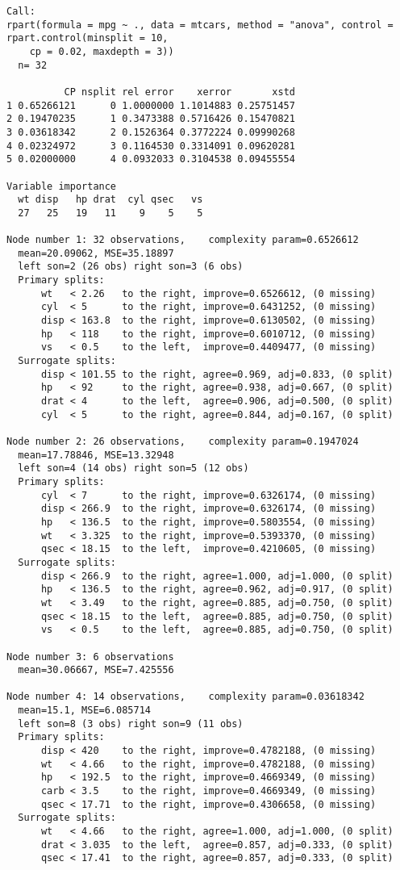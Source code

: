 \documentclass[
  letterpaper,
  DIV=11,
  numbers=noendperiod]{scrreprt}
\begin{document}
\begin{verbatim}
Call:
rpart(formula = mpg ~ ., data = mtcars, method = "anova", control = rpart.control(minsplit = 10, 
    cp = 0.02, maxdepth = 3))
  n= 32 

          CP nsplit rel error    xerror       xstd
1 0.65266121      0 1.0000000 1.1014883 0.25751457
2 0.19470235      1 0.3473388 0.5716426 0.15470821
3 0.03618342      2 0.1526364 0.3772224 0.09990268
4 0.02324972      3 0.1164530 0.3314091 0.09620281
5 0.02000000      4 0.0932033 0.3104538 0.09455554

Variable importance
  wt disp   hp drat  cyl qsec   vs 
  27   25   19   11    9    5    5 

Node number 1: 32 observations,    complexity param=0.6526612
  mean=20.09062, MSE=35.18897 
  left son=2 (26 obs) right son=3 (6 obs)
  Primary splits:
      wt   < 2.26   to the right, improve=0.6526612, (0 missing)
      cyl  < 5      to the right, improve=0.6431252, (0 missing)
      disp < 163.8  to the right, improve=0.6130502, (0 missing)
      hp   < 118    to the right, improve=0.6010712, (0 missing)
      vs   < 0.5    to the left,  improve=0.4409477, (0 missing)
  Surrogate splits:
      disp < 101.55 to the right, agree=0.969, adj=0.833, (0 split)
      hp   < 92     to the right, agree=0.938, adj=0.667, (0 split)
      drat < 4      to the left,  agree=0.906, adj=0.500, (0 split)
      cyl  < 5      to the right, agree=0.844, adj=0.167, (0 split)

Node number 2: 26 observations,    complexity param=0.1947024
  mean=17.78846, MSE=13.32948 
  left son=4 (14 obs) right son=5 (12 obs)
  Primary splits:
      cyl  < 7      to the right, improve=0.6326174, (0 missing)
      disp < 266.9  to the right, improve=0.6326174, (0 missing)
      hp   < 136.5  to the right, improve=0.5803554, (0 missing)
      wt   < 3.325  to the right, improve=0.5393370, (0 missing)
      qsec < 18.15  to the left,  improve=0.4210605, (0 missing)
  Surrogate splits:
      disp < 266.9  to the right, agree=1.000, adj=1.000, (0 split)
      hp   < 136.5  to the right, agree=0.962, adj=0.917, (0 split)
      wt   < 3.49   to the right, agree=0.885, adj=0.750, (0 split)
      qsec < 18.15  to the left,  agree=0.885, adj=0.750, (0 split)
      vs   < 0.5    to the left,  agree=0.885, adj=0.750, (0 split)

Node number 3: 6 observations
  mean=30.06667, MSE=7.425556 

Node number 4: 14 observations,    complexity param=0.03618342
  mean=15.1, MSE=6.085714 
  left son=8 (3 obs) right son=9 (11 obs)
  Primary splits:
      disp < 420    to the right, improve=0.4782188, (0 missing)
      wt   < 4.66   to the right, improve=0.4782188, (0 missing)
      hp   < 192.5  to the right, improve=0.4669349, (0 missing)
      carb < 3.5    to the right, improve=0.4669349, (0 missing)
      qsec < 17.71  to the right, improve=0.4306658, (0 missing)
  Surrogate splits:
      wt   < 4.66   to the right, agree=1.000, adj=1.000, (0 split)
      drat < 3.035  to the left,  agree=0.857, adj=0.333, (0 split)
      qsec < 17.41  to the right, agree=0.857, adj=0.333, (0 split)


\end{verbatim}
\end{document}
